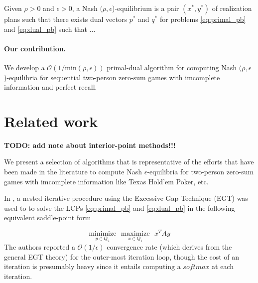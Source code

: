 \documentclass[envcountsame]{llncs} %
\begin{document}
\begin{definition}
Given $\rho > 0$ and $\epsilon > 0$, a Nash $(\rho,\epsilon$)-equilibrium is
a pair $(x^*, y^*)$ of realization plans such that there exists dual
vectors $p^*$ and $q^*$ for problems \eqref{eq:primal_pb} and
\eqref{eq:dual_pb} such that ...
\end{definition}

\paragraph{\textbf{Our contribution.}}
We develop a $\mathcal{O}(1/\text{min}(\rho,\epsilon))$ primal-dual
algorithm for computing Nash $(\rho, \epsilon$)-equilibria for
sequential two-person zero-sum games with imcomplete information and
perfect recall.




\section{Related work}
\label{sec:related_work}
\textbf{TODO: add note about interior-point methods!!!}

We present a selection of algorithms that is representative of the
efforts that have been made in the literature to compute Nash
$\epsilon$-equilibria for two-person zero-sum games with imcomplete
information like Texas Hold'em Poker, etc.


In \cite{hoda2010smoothing}, a nested iterative procedure using the
Excessive Gap Technique (EGT) \cite{nesterov2005excessive} was used to
to solve the LCPs \eqref{eq:primal_pb} and \eqref{eq:dual_pb} in the
following equivalent saddle-point form


\begin{equation}
  \underset{y \in Q_2}{\text{minimize}}\text{ }\underset{x \in
    Q_1}{\text{maximize}}\text{ }x^TAy
  \label{eq:gilpin}
\end{equation}
The authors reported a $\mathcal{O}(1/\epsilon)$ convergence rate
(which derives from the general EGT theory) for the outer-most
iteration loop, though the cost of an iteration is presumably heavy
since it entails computing a $softmax$ at each iteration.
\end{document}
